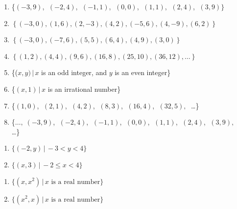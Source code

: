 \begin{enumerate}

\item \{$(-3, 9)$, $\;(-2, 4)$, $\;(-1, 1)$, $\;(0, 0)$, $\;(1, 1)$, $\;(2, 4)$, $\;(3, 9)\}$ \label{setfunctionfirst}
\item  $\left\{ (-3,0), (1,6), (2, -3), (4,2), (-5,6), (4, -9), (6,2) \right\}$
\item  $\left\{ (-3,0), (-7,6), (5,5), (6,4), (4,9), (3,0) \right\}$
\item  $\left\{ (1,2), (4,4), (9,6), (16,8), (25,10), (36, 12), \ldots \right\}$
\item \{($x, y) \, | \, x$ is an odd integer, and $y$ is an even integer\}
\item \{$(x, 1) \, | \, x$ is an irrational number\}
\item \{$(1, 0)$, $\;(2, 1)$, $\;(4, 2)$, $\;(8, 3)$, $\;(16, 4)$, $\;(32, 5), \;$ \ldots\}
\item \{$\ldots, \; (-3, 9)$, $\;(-2, 4)$, $\;(-1, 1)$, $\;(0, 0)$, $\;(1, 1)$, $\;(2, 4)$, $\;(3, 9), \;$ \ldots\}

\setcounter{HW}{\value{enumi}}

\end{enumerate}

\begin{multicols}{2}

\begin{enumerate}

\setcounter{enumi}{\value{HW}}

\item $\{ (-2, y) \, | \, -3 < y < 4\}$
\item  $\{ (x,3) \, | \,  -2 \leq x < 4\}$

\setcounter{HW}{\value{enumi}}
\end{enumerate}
\end{multicols}

\begin{multicols}{2}
\begin{enumerate}
\setcounter{enumi}{\value{HW}}


\item  $\{ \left(x,x^2\right) \, | \, \text{$x$ is a real number} \}$
\item  $\{ \left(x^2,x\right) \, | \, \text{$x$ is a real number} \}$ \label{setfunctionlast}

\setcounter{HW}{\value{enumi}}
\end{enumerate}
\end{multicols}


